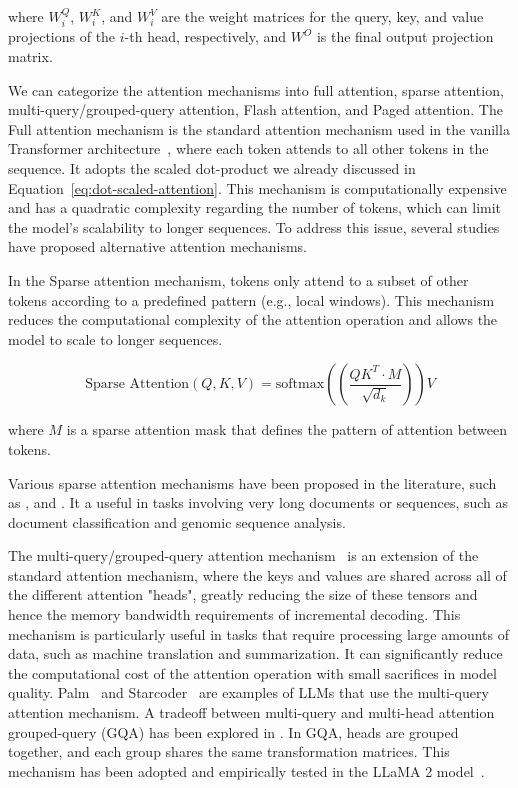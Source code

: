 \noindent where \(W_i^Q\), \(W_i^K\), and \(W_i^V\) are the weight matrices for the query, key, and value projections of the \(i\)-th head, respectively, and \(W^O\) is the final output projection matrix.

We can categorize the attention mechanisms into full attention, sparse attention, multi-query/grouped-query attention, Flash attention, and Paged attention.
The Full attention mechanism is the standard attention mechanism used in the vanilla Transformer architecture~\cite{vaswani2023attention}, where each token attends to all other tokens in the sequence.
It adopts the scaled dot-product we already discussed in Equation~\ref{eq:dot-scaled-attention}.
This mechanism is computationally expensive and has a quadratic complexity regarding the number of tokens, which can limit the model's scalability to longer sequences.
To address this issue, several studies have proposed alternative attention mechanisms.

In the Sparse attention mechanism, tokens only attend to a subset of other tokens according to a predefined pattern (e.g., local windows).
This mechanism reduces the computational complexity of the attention operation and allows the model to scale to longer sequences.

\begin{equation}
	\text{Sparse Attention}(Q, K, V) = \text{softmax}((\frac{QK^T \cdotp M}{\sqrt{d_k}}))V
	\label{eq:sparse-attention}
\end{equation}

\noindent where \(M\) is a sparse attention mask that defines the pattern of attention between tokens.

Various sparse attention mechanisms have been proposed in the literature, such as \textcite{peng2021random}, \textcite{zaheer2020big} and \textcite{child2019generating}.
It a useful in tasks involving very long documents or sequences, such as document classification and genomic sequence analysis.

The multi-query/grouped-query attention mechanism~\cite{shazeer2019fast} is an extension of the standard attention mechanism, where the keys and values are shared across all of the different attention "heads", greatly reducing the size of these tensors and hence the memory bandwidth requirements of incremental decoding.
This mechanism is particularly useful in tasks that require processing large amounts of data, such as machine translation and summarization.
It can significantly reduce the computational cost of the attention operation with small sacrifices in model quality.
Palm~\cite{chowdhery2022palm} and Starcoder~\cite{li2023starcoder} are examples of LLMs that use the multi-query attention mechanism.
A tradeoff between multi-query and multi-head attention grouped-query (GQA) has been explored in \textcite{ainslie2023gqa}.
In GQA, heads are grouped together, and each group shares the same transformation matrices.
This mechanism has been adopted and empirically tested in the LLaMA 2 model~\cite{touvron2023llama2}.

